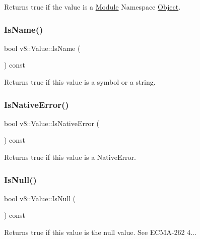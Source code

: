 Returns true if the value is a \mbox{\hyperlink{classv8_1_1Module}{Module}} Namespace \mbox{\hyperlink{classv8_1_1Object}{Object}}. \mbox{\label{classv8_1_1Value_a1ae3d5f5823705d2b6c26378201b772b}} 
\subsubsection{\texorpdfstring{Is\+Name()}{IsName()}}
{\footnotesize\ttfamily bool v8\+::\+Value\+::\+Is\+Name (\begin{DoxyParamCaption}{ }\end{DoxyParamCaption}) const}

Returns true if this value is a symbol or a string. \mbox{\label{classv8_1_1Value_a7dc01ab1db65640f774366e8ecab91df}} 
\subsubsection{\texorpdfstring{Is\+Native\+Error()}{IsNativeError()}}
{\footnotesize\ttfamily bool v8\+::\+Value\+::\+Is\+Native\+Error (\begin{DoxyParamCaption}{ }\end{DoxyParamCaption}) const}

Returns true if this value is a Native\+Error. \mbox{\label{classv8_1_1Value_a7710cf2aca870e961f1df65ef6057eb4}} 
\subsubsection{\texorpdfstring{Is\+Null()}{IsNull()}}
{\footnotesize\ttfamily bool v8\+::\+Value\+::\+Is\+Null (\begin{DoxyParamCaption}{ }\end{DoxyParamCaption}) const}

Returns true if this value is the null value. See E\+C\+M\+A-\/262 4... \mbox{\label{classv8_1_1Value_a47bb1e442bf9741e9e29468659e8cdba}} 
